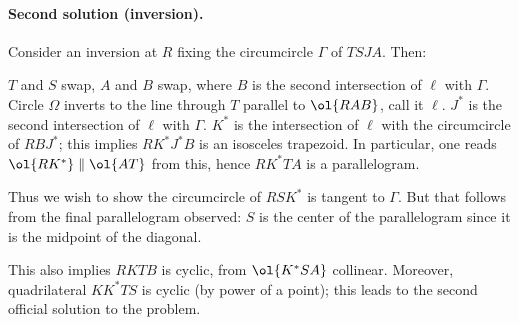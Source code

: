 \paragraph{Second solution (inversion).}
Consider an inversion at $R$ fixing the circumcircle $\Gamma$ of $TSJA$.
Then:
\begin{itemize}
  \ii $T$ and $S$ swap,
  \ii $A$ and $B$ swap, where $B$ is the second intersection
  of $\ell$ with $\Gamma$.
  \ii Circle $\Omega$ inverts to the line through $T$
  parallel to $\ol{RAB}$, call it $\ell$.
  \ii $J^\ast$ is the second intersection of $\ell$ with $\Gamma$.
  \ii $K^\ast$ is the intersection of $\ell$ with the circumcircle
  of $RBJ^\ast$; this implies $RK^\ast J^\ast B$ is an isosceles trapezoid.
  In particular, one reads $\ol{RK^\ast} \parallel \ol{AT}$ from this,
  hence $RK^\ast TA$ is a parallelogram.
\end{itemize}
Thus we wish to show the circumcircle of $RSK^\ast$ is tangent to $\Gamma$.
But that follows from the final parallelogram observed:
$S$ is the center of the parallelogram since it is the midpoint of the diagonal.

\begin{remark*}
  This also implies $RKTB$ is cyclic, from $\ol{K^\ast SA}$ collinear.
  Moreover, quadrilateral $KK^\ast TS$ is cyclic (by power of a point);
  this leads to the second official solution to the problem.
\end{remark*}
\pagebreak